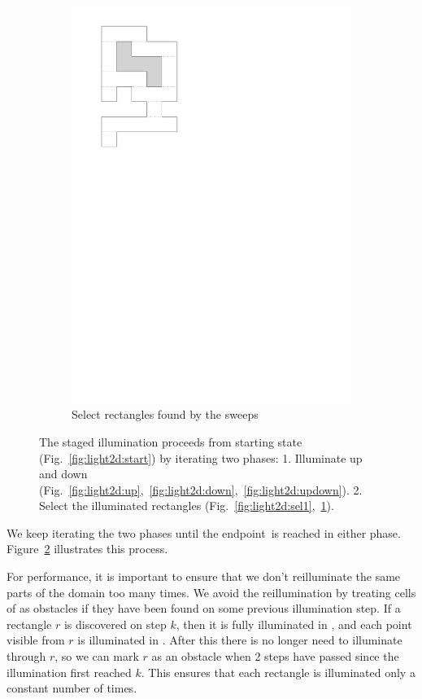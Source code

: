 \documentclass[english,gradu]{tktltiki2018}
\begin{document}
\begin{figure}
\begin{subfigure}[t]{0.15\textwidth}
		\includegraphics[width=\textwidth,page=7]{fig/light2d}
		\caption{Select rectangles found by the sweeps}\label{fig:light2d:sel2}
	\end{subfigure}
	\caption{The staged illumination proceeds from starting state (Fig.~\ref{fig:light2d:start}) by iterating two phases:
	1. Illuminate up and down (Fig.~\ref{fig:light2d:up},~\ref{fig:light2d:down},~\ref{fig:light2d:updown}).
	2. Select the illuminated rectangles (Fig.~\ref{fig:light2d:sel1},~\ref{fig:light2d:sel2}).
	}\label{fig:light2d}
\end{figure}

We keep iterating the two phases until the endpoint~\ept is reached in either phase.
Figure~\ref{fig:light2d} illustrates this process.

For performance, it is important to ensure that we don't reilluminate the same parts of the domain too many times.
We avoid the reillumination by treating cells of  as obstacles if they have been found on some previous illumination step.
If a rectangle $r$ is discovered on step $k$, then it is fully illuminated in , and each point visible from $r$ is illuminated in .
After this there is no longer need to illuminate through $r$, so we can mark $r$ as an obstacle when 2 steps have passed since the illumination first reached $k$.
This ensures that each rectangle is illuminated only a constant number of times.
\end{document}

